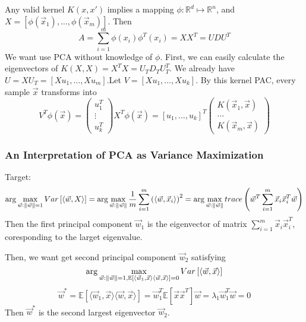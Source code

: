 Any valid kernel $ K(x, x') $ implies a mapping $ \phi: \mathbb{R}^d \mapsto \mathbb{R}^n $, and
$ X = \left[ \phi(\vec{x}_1), \ldots, \phi(\vec{x}_m) \right] $.
Then
\[
     A = \sum^{m}_{i=1} \phi(x_i) \phi^T(x_i) = X X^T = U D U^T
\]
We want use PCA without knowledge of $ \phi $. First, we can easily calculate the eigenvectors of $ K(X, X) = X^T X = U_{T} D_{T} U_{T}^T $. We already have $ U = X U_T = \left[ Xu_1, \ldots, Xu_m \right]$.Let $ V = \left[ Xu_1, \ldots, X u_k \right] $.
By this kernel PAC, every sample $ \vec{x} $ transforms into
\[
    V^T \phi(\vec{x}) = 
    \begin{pmatrix}
       u_1^T\\ \vdots \\ u_k^T 
    \end{pmatrix}
    X^T \phi(\vec{x})
    = {\left[ u_1, \ldots, u_k \right]}^T
    \begin{pmatrix}
        K(\vec{x}_1, \vec{x}) \\ \ldots \\ K(\vec{x}_m, \vec{x}) 
    \end{pmatrix}
\]

\subsubsection{An Interpretation of PCA as Variance Maximization}%

Target:
\[
    \arg\max_{\vec{w}: \Arrowvert \vec{w} \Arrowvert = 1} Var\left[ \langle \vec{w}, X \rangle \right] 
    = \arg\max_{\vec{w}: \Arrowvert \vec{w} \Arrowvert} \frac{1}{m} \sum^{m}_{i=1} {\left( \langle \vec{w}, \vec{x}_i \rangle \right)}^2
    = \arg\max_{\vec{w}: \Arrowvert \vec{w} \Arrowvert} trace \left( \vec{w}^T \sum^{m}_{i=1} \vec{x}_i \vec{x}^T_i \vec{w} \right) 
\]
Then the first principal component $ \vec{w}_1 $ is the eigenvector of matrix $ \sum^{m}_{i=1} \vec{x}_i \vec{x}^T_i $, coresponding to the larget eigenvalue.

Then, we want get second principal component $ \vec{w}_2 $ satisfying
\[
    \arg\max_{\vec{w}: \Arrowvert \vec{w} \Arrowvert = 1, \mathbb{E}[\langle \vec{w}_1, \vec{x} \rangle \langle \vec{w}, \vec{x} \rangle] = 0} Var\left[ \langle \vec{w}, \vec{x} \rangle \right]
\]
\[
    \vec{w}^* = \mathbb{E}[\langle \vec{w}_1, \vec{x} \rangle \langle \vec{w}, \vec{x} \rangle]
    = \vec{w}^T_1 \mathbb{E}\left[ \vec{x} \vec{x}^T \right] \vec{w} = \lambda_1 \vec{w}^T_1 \vec{w} = 0
\]
Then $ \vec{w}^* $ is the second largest eigenvector $ \vec{w}_2 $.

